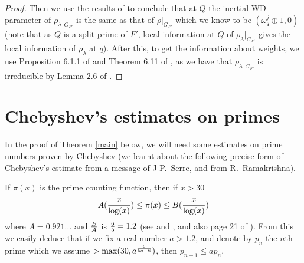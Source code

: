 \documentclass[12pt]{amsart}
\newcommand{\rhobar}{\overline{\rho}}
\def\rhobar{ {\bar {\rho} } }
\begin{document}
\begin{proof}
Then we use the results of \cite{Saito} to conclude that at $Q$ the inertial WD parameter of $\rho_\lambda|_{G_{F'}}$ 
is the same as that of $\rho|_{G_{F'}}$ which we know to be $(\omega_q^j \oplus 1, 0)$
(note that as $Q$ is a split prime of 
$F'$, local information at $Q$ of $\rho_\lambda|_{G_{F'}}$ gives the local information of $\rho_\lambda$
at $q$).  After this, to get the information about 
weights, we use Proposition 6.1.1 of \cite{BM} and Theorem 6.11 of \cite{Savitt1},
as we have that $\rho_\lambda|_{G_{F'}}$
is irreducible by Lemma 2.6 of \cite{KW}.
\end{proof}




\section{Chebyshev's estimates on primes}\label{cheb}

In the proof of Theorem \ref{main} below, 
we will need some estimates on prime numbers proven by Chebyshev (we learnt about 
the following precise form of Chebyshev's estimate from a message of J-P.~Serre, and from R.~Ramakrishna). 

If $\pi(x)$ is the prime counting function, then if $x >30$
$$A({ x \over {\rm log}(x)}) \leq \pi(x) \leq B({ x \over {\rm log}(x)})$$ where $A=0.921...$ and 
$B \over A$ is ${6 \over 5}=1.2$ (see \cite{Chebyshev1} and \cite{Chebyshev2}, and also page 21 of \cite{Ellison}). From this we easily deduce that
if we fix a real number $a>1.2$, and denote by $p_n$ the $n$th prime which we
assume $> {\rm max}(30,a^{{6} \over {5a-6}})$, then $p_{n+1} \leq ap_n$. 
\end{document}
